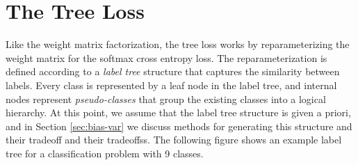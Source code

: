\documentclass[10pt]{article}
\theoremstyle{definition}
\begin{document}

\section{The Tree Loss}

Like the weight matrix factorization, the tree loss works by reparameterizing the weight matrix for the softmax cross entropy loss.
The reparameterization is defined according to a \emph{label tree} structure that captures the similarity between labels.
Every class is represented by a leaf node in the label tree,
and internal nodes represent \emph{pseudo-classes} that group the existing classes into a logical hierarchy.
At this point, we assume that the label tree structure is given a priori, and in Section \ref{sec:bias-var} we discuss methods for generating this structure and their tradeoff and their tradeoffss.
The following figure shows an example label tree for a classification problem with 9 classes.

\begin{center}
\end{center}
\end{document}
